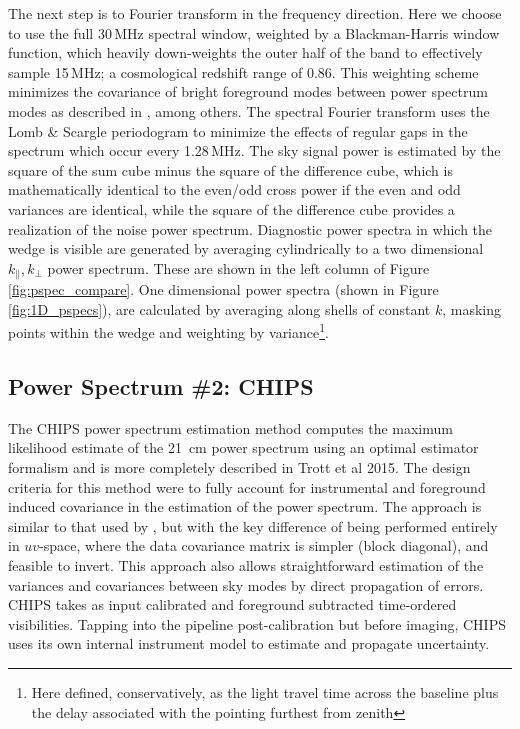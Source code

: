 \documentclass[twolcolumn,iop]{emulateapj}
\def\chipscite{Trott et al 2015}
\begin{document}
The next step is to Fourier transform in the frequency direction. Here we choose to use the full 30\,MHz spectral window, weighted by a Blackman-Harris window function, which heavily down-weights the outer half of the band to effectively sample 15\,MHz; a cosmological redshift range of 0.86. This weighting scheme minimizes the covariance of bright foreground modes between power spectrum modes as described in \cite{Thyagarajan:2013p10039,Parsons:2012p8896,Vedantham:2012p9026}, among others.  The spectral Fourier transform uses the Lomb \& Scargle periodogram to minimize the effects of regular gaps in the spectrum which occur every 1.28\,MHz.    The sky signal power is  estimated by the square of the sum cube minus the square of the difference cube, which  is mathematically identical to the even/odd cross power if the even and odd variances are identical, while the square of the difference cube provides a realization of the noise power spectrum. Diagnostic power spectra in which the wedge is visible are generated by averaging cylindrically to a two dimensional $k_{\|},k_{\bot}$ power spectrum.  These are shown in the left column of Figure \ref{fig:pspec_compare}.  One dimensional power spectra (shown in Figure \ref{fig:1D_pspecs}), are calculated by averaging along shells of constant $k$, masking points within the wedge and weighting by variance\footnote{Here defined, conservatively, as the light travel time across the baseline plus the delay associated with the pointing furthest from zenith}.






\subsection{Power Spectrum \#2: CHIPS}
\label{sec:CHIPS}
The CHIPS power spectrum estimation method computes the maximum likelihood estimate of the 21~cm power spectrum using an optimal estimator formalism and is more completely described in \chipscite{}.  The design criteria for this method were to fully account for instrumental and foreground induced covariance in the estimation of the power spectrum.  The approach is similar to that used by \cite{Liu:2011p8763}, but with the key difference of being performed entirely in $uv$-space, where the data covariance matrix is simpler (block diagonal), and feasible to invert. This approach also allows straightforward estimation of the variances and covariances between sky modes by direct propagation of errors. CHIPS takes as input calibrated and foreground subtracted time-ordered visibilities. Tapping into the pipeline post-calibration but before imaging, CHIPS uses its own internal instrument model to estimate and propagate uncertainty.	
\end{document}
